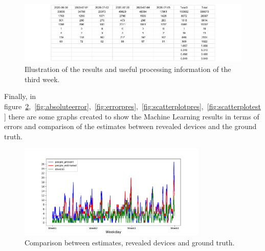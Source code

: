 \begin{figure}[h]
\centering 
\includegraphics[width=1\textwidth]{images/testresults3} 
\caption{Illustration of the results and useful processing information of the third week.}
\label{fig:testresults3}
\end{figure}


Finally, in figure~\ref{fig:comparison},~\ref{fig:absoluteerror},~\ref{fig:errorpres},~\ref{fig:scatterplotpres},~\ref{fig:scatterplotest} there are some graphs created to show the Machine Learning results in terms of errors and comparison of the estimates between revealed devices and the ground truth.

\begin{figure}[h]
\centering 
\includegraphics[width=0.8\textwidth]{images/comparison} 
\caption{Comparison between estimates, revealed devices and ground truth.}
\label{fig:comparison}
\end{figure}


